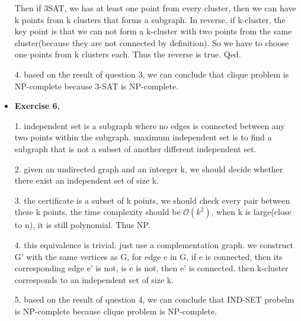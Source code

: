\documentclass{article}
\newcommand{\bigO}{\mathcal{O}}
\begin{document}
\begin{itemize}
Then if 3SAT, we has at least one point from every cluster, then we can have k points from k clusters that forms a subgraph. In reverse, if k-cluster, the key point is that we can not form a k-cluster with two points from the same sluster(because they are not connected by definition). So we have to choose one points from k clusters each. Thus the reverse is true. Qed.

4. based on the result of question 3, we can conclude that clique problem is NP-complete because 3-SAT is NP-complete.

\item \textbf{Exercise 6.}

1. independent set is a subgraph where no edges is connected between any two points within the subgraph. maximum independent set is to find a subgraph that is not a subset of another different independent set.

2. given an undirected graph and an inteeger k, we should decide whether there exist an independent set of size k.

3. the certificate is a subset of k points, we should check every pair between these k points, the time complexity should be $\bigO (k^2)$, when k is large(close to n), it is still polynomial. Thus NP.

4. this equivalence is trivial. just use a complementation graph. we construct G' with the same vertices as G, for edge e in G, if e is connected, then its corresponding edge e' is not, is e is not, then e' is connected. then k-cluster corresponds to an independent set of size k.

5. based on the result of question 4, we can conclude that IND-SET probelm is NP-complete because clique problem is NP-complete.


\end{itemize}

\end{document}
